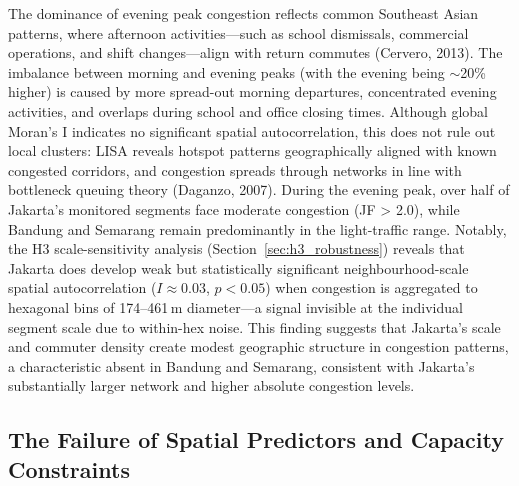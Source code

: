 \documentclass[12pt,a4paper]{article}
\begin{document}
The dominance of evening peak congestion reflects common Southeast Asian patterns, where afternoon activities—such as school dismissals, commercial operations, and shift changes—align with return commutes (Cervero, 2013). The imbalance between morning and evening peaks  (with the evening being $\sim$20\% higher) is caused by more spread-out morning departures, concentrated evening activities, and overlaps during school and office closing times. Although global Moran’s I indicates no significant spatial autocorrelation, this does not rule out local clusters: LISA reveals hotspot patterns geographically aligned with known congested corridors, and congestion spreads through networks in line with bottleneck queuing theory (Daganzo, 2007). During the evening peak, over half of Jakarta’s monitored segments face moderate congestion (JF > 2.0), while Bandung and Semarang remain predominantly in the light-traffic range. Notably, the H3 scale-sensitivity analysis (Section~\ref{sec:h3_robustness}) reveals that Jakarta does develop weak but statistically significant neighbourhood-scale spatial autocorrelation ($I \approx 0.03$, $p < 0.05$) when congestion is aggregated to hexagonal bins of 174--461\,m diameter---a signal invisible at the individual segment scale due to within-hex noise. This finding suggests that Jakarta's scale and commuter density create modest geographic structure in congestion patterns, a characteristic absent in Bandung and Semarang, consistent with Jakarta's substantially larger network and higher absolute congestion levels.

\subsection{The Failure of Spatial Predictors and Capacity Constraints}
\end{document}
